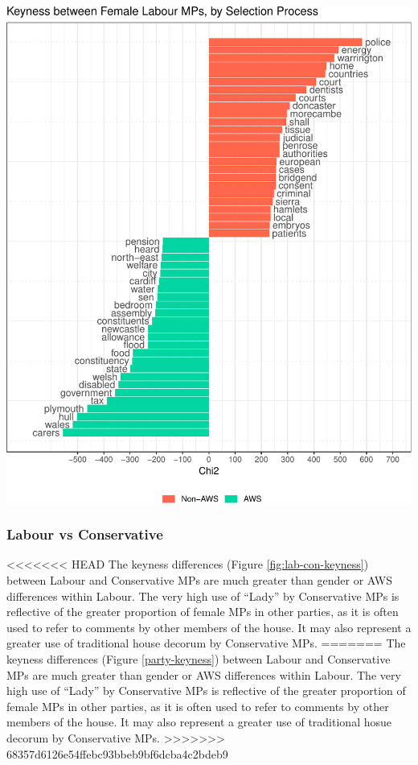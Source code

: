 \documentclass[]{article}
\let\origfigure\figure
\let\endorigfigure\endfigure
\renewenvironment{figure}[1][2] {
    \expandafter\origfigure\expandafter[H]
} {
    \endorigfigure
}
\theoremstyle{definition}
\theoremstyle{definition}
\theoremstyle{definition}
\theoremstyle{remark}
\begin{document}
\begin{table}[H]
\begin{table}[H]
\begin{table}[H]
\begin{table}[H]
\begin{table}[H]
\begin{table}[H]
\begin{table}[H]
\begin{table}[H]
\begin{figure}
{\includegraphics{methodology_files/figure-latex/short-list-keyness-plot-1.pdf}
\caption{\label{sl-keyness}Keyness between Female Labour MPs, by
>>>>>>> 68357d6126e54ffebc93bbeb9bf6dcba4c2bdeb9
Selection Process}
\end{figure}

\hypertarget{labour-vs-conservative}{%
\subsubsection{Labour vs Conservative}\label{labour-vs-conservative}}

<<<<<<< HEAD
The keyness differences (Figure \ref{fig:lab-con-keyness}) between
Labour and Conservative MPs are much greater than gender or AWS
differences within Labour. The very high use of ``Lady'' by Conservative
MPs is reflective of the greater proportion of female MPs in other
parties, as it is often used to refer to comments by other members of
the house. It may also represent a greater use of traditional house
decorum by Conservative MPs.
=======
The keyness differences (Figure \ref{party-keyness}) between Labour and
Conservative MPs are much greater than gender or AWS differences within
Labour. The very high use of ``Lady'' by Conservative MPs is reflective
of the greater proportion of female MPs in other parties, as it is often
used to refer to comments by other members of the house. It may also
represent a greater use of traditional hosue decorum by Conservative
MPs.
>>>>>>> 68357d6126e54ffebc93bbeb9bf6dcba4c2bdeb9


\end{table}
\end{table}
\end{table}
\end{table}
\end{table}
\end{table}
\end{table}
\end{table}
\end{document}

